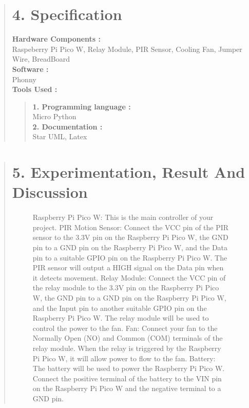 \documentclass[12pt]{report}
\begin{document}
	
	\begin{quote}
		\section{4. Specification}
		\textbf{Hardware Components : }\\
		Raspeberry Pi Pico W, Relay Module, PIR Sensor, Cooling Fan, Jumper Wire, BreadBoard\\
		\vspace{0.3cm}
		\textbf{Software :  }\\
		Phonny		\\
		\vspace{0.3cm}
		\textbf{Tools Used : }\\
		\begin{quote}
			\textbf{1. Programming language :}\\Micro Python\\
			\vspace{0.2cm}
			\textbf{2. Documentation :}\\Star UML, Latex\\
		\end{quote}
	\end{quote}
	\clearpage
	
	\clearpage
	
	
	\begin{quote}
		\section{5. Experimentation, Result And Discussion}
		\begin{figure}[h]
			\centering
			\paragraph{}
			\justify
			Raspberry Pi Pico W: This is the main controller of your project. 
			PIR Motion Sensor: Connect the VCC pin of the PIR sensor to the 3.3V pin on the Raspberry Pi Pico W, the GND pin to a GND pin on the Raspberry Pi Pico W, and the Data pin to a suitable GPIO pin on the Raspberry Pi Pico W. The PIR sensor will output a HIGH signal on the Data pin when it detects movement.
			Relay Module: Connect the VCC pin of the relay module to the 3.3V pin on the Raspberry Pi Pico W, the GND pin to a GND pin on the Raspberry Pi Pico W, and the Input pin to another suitable GPIO pin on the Raspberry Pi Pico W. The relay module will be used to control the power to the fan.
			Fan: Connect your fan to the Normally Open (NO) and Common (COM) terminals of the relay module. When the relay is triggered by the Raspberry Pi Pico W, it will allow power to flow to the fan.
			Battery: The battery will be used to power the Raspberry Pi Pico W. Connect the positive terminal of the battery to the VIN pin on the Raspberry Pi Pico W and the negative terminal to a GND pin.
		\end{figure}
		\clearpage
		
	\end{quote}
	\clearpage
	
\end{document}
